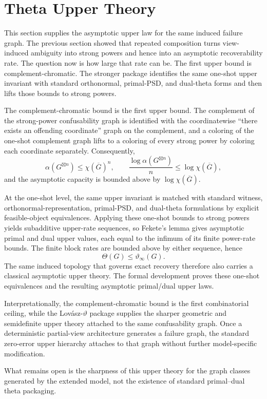 \section{Theta Upper Theory}\label{sec:theta-theory}


This section supplies the asymptotic upper law for the same induced failure graph. The previous section showed that repeated composition turns view-induced ambiguity into strong powers and hence into an asymptotic recoverability rate. The question now is how large that rate can be. The first upper bound is complement-chromatic. The stronger package identifies the same one-shot upper invariant with standard orthonormal, primal-PSD, and dual-theta forms and then lifts those bounds to strong powers.

The complement-chromatic bound is the first upper bound. The complement of the strong-power confusability graph is identified with the coordinatewise ``there exists an offending coordinate'' graph on the complement, and a coloring of the one-shot complement graph lifts to a coloring of every strong power by coloring each coordinate separately. Consequently,
\[
\alpha(G^{\boxtimes n}) \le \chi(\overline G)^n,
\qquad
\frac{\log \alpha(G^{\boxtimes n})}{n} \le \log \chi(\overline G),
\]
and the asymptotic capacity is bounded above by $\log \chi(\overline G)$.

At the one-shot level, the same upper invariant is matched with standard witness, orthonormal-representation, primal-PSD, and dual-theta formulations by explicit feasible-object equivalences. Applying these one-shot bounds to strong powers yields subadditive upper-rate sequences, so Fekete's lemma gives asymptotic primal and dual upper values, each equal to the infimum of its finite power-rate bounds. The finite block rates are bounded above by either sequence, hence
\[
\Theta(G)\le \vartheta_{\infty}(G).
\]
The same induced topology that governs exact recovery therefore also carries a classical asymptotic upper theory. The formal development proves these one-shot equivalences and the resulting asymptotic primal/dual upper laws.

Interpretationally, the complement-chromatic bound is the first combinatorial ceiling, while the Lov\'asz-$\vartheta$ package supplies the sharper geometric and semidefinite upper theory attached to the same confusability graph. Once a deterministic partial-view architecture generates a failure graph, the standard zero-error upper hierarchy attaches to that graph without further model-specific modification.

What remains open is the sharpness of this upper theory for the graph classes generated by the extended model, not the existence of standard primal--dual theta packaging.
